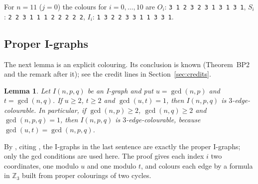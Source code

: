 \documentclass[11pt]{amsart}
\theoremstyle{plain}
\newcommand{\letteredname}{}
\newtheorem*{letteredinner}{Lemma \letteredname}
\newenvironment{lettered}[1]{\renewcommand{\letteredname}{#1}\begin{letteredinner}}{\end{letteredinner}}
\theoremstyle{definition}
\theoremstyle{remark}
\numberwithin{equation}{section}
\newcommand{\Z}{\mathbb{Z}}
\newcommand{\ttt}[1]{\texttt{#1}}
\begin{document}
For \(n=11\) (\(j=0\)) the colours for \(i=0,\dots,10\) are \(O_i\): \ttt{3 1 2 3 2 3 1 3 1 3 1}, \(S_i\): \ttt{2 2 3 1 1 1 2 2 2 2 2}, \(I_i\): \ttt{1 3 2 2 3 3 1 1 3 3 1}.

\subsection{Proper I-graphs}

The next lemma is an explicit colouring. Its conclusion is known (Theorem~BP2 and the remark after it); see the credit lines in Section~\ref{sec:credits}.

\begin{lettered}{N1}
Let \(I(n,p,q)\) be an I-graph and put \(u=\gcd(n,p)\) and \(t=\gcd(n,q)\). If \(u\ge2\), \(t\ge2\) and \(\gcd(u,t)=1\), then \(I(n,p,q)\) is \(3\)-edge-colourable. In particular, if \(\gcd(n,p)\ge2\), \(\gcd(n,q)\ge2\) and \(\gcd(n,p,q)=1\), then \(I(n,p,q)\) is \(3\)-edge-colourable, because \(\gcd(u,t)=\gcd(n,p,q)\).
\end{lettered}

By \cite{BP}, citing \cite{BPZ}, the I-graphs in the last sentence are exactly the proper I-graphs; only the gcd conditions are used here. The proof gives each index \(i\) two coordinates, one modulo \(u\) and one modulo \(t\), and colours each edge by a formula in \(\Z_3\) built from proper colourings of two cycles.
\end{document}
